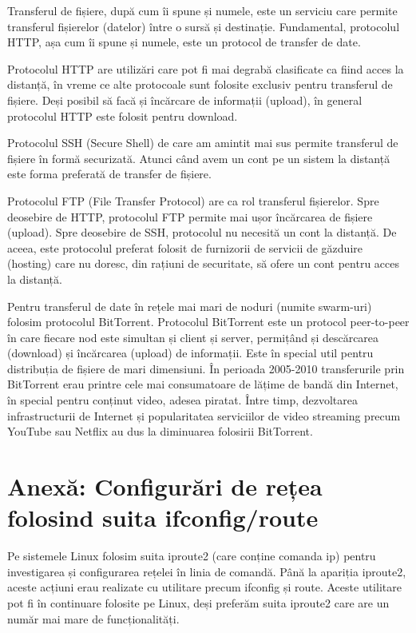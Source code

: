 Transferul de fișiere, după cum îi spune și numele, este un serviciu care permite transferul fișierelor (datelor) între o sursă și destinație. Fundamental, protocolul HTTP, așa cum îi spune și numele, este un protocol de transfer de date.

Protocolul HTTP are utilizări care pot fi mai degrabă clasificate ca fiind acces la distanță, în vreme ce alte protocoale sunt folosite exclusiv pentru transferul de fișiere. Deși posibil să facă și încărcare de informații (upload), în general protocolul HTTP este folosit pentru download.

Protocolul SSH (Secure Shell) de care am amintit mai sus permite transferul de fișiere în formă securizată. Atunci când avem un cont pe un sistem la distanță este forma preferată de transfer de fișiere.

Protocolul FTP (File Transfer Protocol) are ca rol transferul fișierelor. Spre deosebire de HTTP, protocolul FTP permite mai ușor încărcarea de fișiere (upload). Spre deosebire de SSH, protocolul nu necesită un cont la distanță. De aceea, este protocolul preferat folosit de furnizorii de servicii de găzduire (hosting) care nu doresc, din rațiuni de securitate, să ofere un cont pentru acces la distanță.

Pentru transferul de date în rețele mai mari de noduri (numite swarm-uri) folosim protocolul BitTorrent. Protocolul BitTorrent este un protocol peer-to-peer în care fiecare nod este simultan și client și server, permițând și descărcarea (download) și încărcarea (upload) de informații. Este în special util pentru distribuția de fișiere de mari dimensiuni. În perioada 2005-2010 transferurile prin BitTorrent erau printre cele mai consumatoare de lățime de bandă din Internet, în special pentru conținut video, adesea piratat. Între timp, dezvoltarea infrastructurii de Internet și popularitatea serviciilor de video streaming precum YouTube sau Netflix au dus la diminuarea folosirii BitTorrent.

\section{Anexă: Configurări de rețea folosind suita ifconfig/route}
\label{sec:net:config-ifconfig}

Pe sistemele Linux folosim suita iproute2 (care conține comanda ip) pentru investigarea și configurarea rețelei în linia de comandă. Până la apariția iproute2, aceste acțiuni erau realizate cu utilitare precum ifconfig și route. Aceste utilitare pot fi în continuare folosite pe Linux, deși preferăm suita iproute2 care are un număr mai mare de funcționalități.

